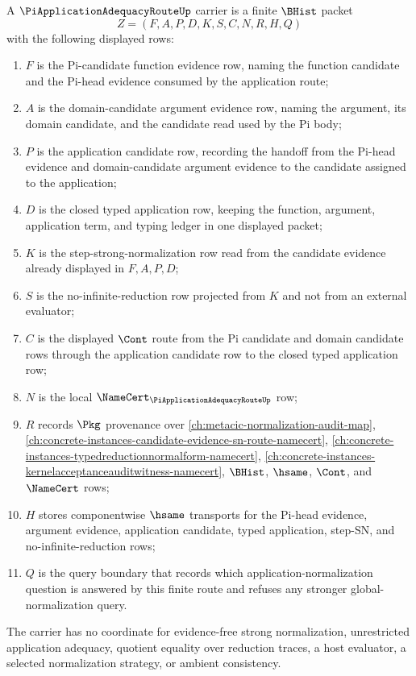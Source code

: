 \begin{definition}
\label{def:pi-application-adequacy-route-carrier}
A $\PiApplicationAdequacyRouteUp$ carrier is a finite $\BHist$ packet
$$
Z=(F,A,P,D,K,S,C,N,R,H,Q)
$$
with the following displayed rows:
\begin{enumerate}
\item $F$ is the Pi-candidate function evidence row, naming the function candidate and the Pi-head evidence consumed by the application route;
\item $A$ is the domain-candidate argument evidence row, naming the argument, its domain candidate, and the candidate read used by the Pi body;
\item $P$ is the application candidate row, recording the handoff from the Pi-head evidence and domain-candidate argument evidence to the candidate assigned to the application;
\item $D$ is the closed typed application row, keeping the function, argument, application term, and typing ledger in one displayed packet;
\item $K$ is the step-strong-normalization row read from the candidate evidence already displayed in $F,A,P,D$;
\item $S$ is the no-infinite-reduction row projected from $K$ and not from an external evaluator;
\item $C$ is the displayed $\Cont$ route from the Pi candidate and domain candidate rows through the application candidate row to the closed typed application row;
\item $N$ is the local $\NameCert_{\PiApplicationAdequacyRouteUp}$ row;
\item $R$ records $\Pkg$ provenance over \autoref{ch:metacic-normalization-audit-map}, \autoref{ch:concrete-instances-candidate-evidence-sn-route-namecert}, \autoref{ch:concrete-instances-typedreductionnormalform-namecert}, \autoref{ch:concrete-instances-kernelacceptanceauditwitness-namecert}, $\BHist$, $\hsame$, $\Cont$, and $\NameCert$ rows;
\item $H$ stores componentwise $\hsame$ transports for the Pi-head evidence, argument evidence, application candidate, typed application, step-SN, and no-infinite-reduction rows;
\item $Q$ is the query boundary that records which application-normalization question is answered by this finite route and refuses any stronger global-normalization query.
\end{enumerate}
The carrier has no coordinate for evidence-free strong normalization, unrestricted application adequacy, quotient equality over reduction traces, a host evaluator, a selected normalization strategy, or ambient consistency.
\end{definition}

